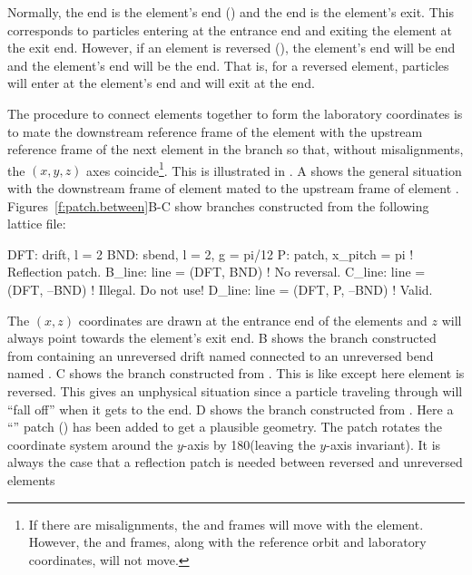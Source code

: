 Normally, the  end is the element's  end () and the
 end is the element's  exit. This corresponds to particles entering at the
entrance end and exiting the element at the exit end. However, if an element is reversed
(), the element's  end will be  end and the element's
 end will be the  end. That is, for a reversed element, particles will
enter at the element's  end and will exit at the  end.

The procedure to connect elements together to form the laboratory coordinates is to mate the
downstream reference frame of the element with the upstream reference frame of the next element in
the branch so that, without misalignments, the $(x,y,z)$ axes coincide\footnote
  {
If there are misalignments, the  and  frames will move with the element. However,
the  and  frames, along with the reference orbit and laboratory
coordinates, will not move.
  }. 
This is illustrated in . A shows the general situation
with the downstream frame of element  mated to the upstream frame of element .
Figures~\ref{f:patch.between}B-C show branches constructed from the following lattice file:
\begin{example}
  DFT: drift, l = 2
  BND: sbend, l = 2, g = pi/12
  P: patch, x_pitch = pi          ! Reflection patch.
  B_line: line = (DFT, BND)       ! No reversal.
  C_line: line = (DFT, --BND)     ! Illegal. Do not use!
  D_line: line = (DFT, P, --BND)  ! Valid.
\end{example}
The $(x,z)$ coordinates are drawn at the entrance end of the elements and $z$ will always point
towards the element's exit end.  B shows the branch constructed from
 containing an unreversed drift named  connected to an unreversed bend named
. C shows the branch constructed from . This is like
 except here element  is reversed. This gives an unphysical situation since a
particle traveling through  will ``fall off'' when it gets to the end.
D shows the branch constructed from . Here a ``''
patch  () has been added to get a plausible geometry. The patch rotates the
coordinate system around the $y$-axis by 180\Deg (leaving the $y$-axis invariant). It is always the
case that a reflection patch is needed between reversed and unreversed elements

